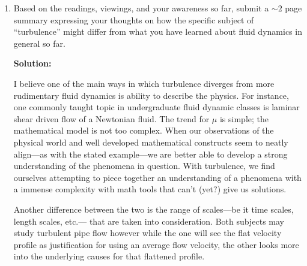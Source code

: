 \documentclass[12tpt]{article}
\newenvironment{Solution}
    {\textbf{Solution:}
    
    \vspace{5mm}
    \begin{tcolorbox}
    }
    {
    \end{tcolorbox}
    \vspace{5mm}
    }
\begin{document}
\begin{enumerate}
\begin{Solution}
For the hot wire anemometer to capture the smallest scale effects the length must be on the same order as $\eta$, where 
\begin{equation}
    \eta \sim  \left[\frac{\nu^3\ell}{\bar{u}^3}\right]^{\frac{1}{4}} \sim \boxed{\SI{1.28E-3}{\meter}}
\end{equation}
To find the permissible noise level, let
\begin{equation}
    E(k) = a k^{-5/3}
\end{equation}
We can integrate this over the given spectrum for this problem, to get $\frac{1}{2}u'u'$
\begin{equation}
    \frac{1}{2}u' u' = \int_\frac{1}{100} ^\frac{1}{1.28E-3} a k^{-5/3} dk = -a\frac{3}{2}\left[780^{-2/3} -  0.01^{-2/3}\right]
\end{equation}
So, with $u'=\SI{0.5}{\meter\per\second}$, we get $a = 0.0038$. The turbulent intensity 
\end{Solution}
\newpage

\item Based on the readings, viewings, and your awareness so far, submit a $\sim2$ page summary expressing your thoughts on how the specific subject of “turbulence” might differ from what you have learned about fluid dynamics in general so far.

\begin{Solution}
\par{I believe one of the main ways in which turbulence diverges from more rudimentary fluid dynamics is ability to describe the physics. For instance, one commonly taught topic in undergraduate fluid dynamic classes is laminar shear driven flow of a Newtonian fluid. The trend for $\mu$ is simple; the mathematical model is not too complex. When our observations of the physical world and well developed mathematical constructs seem to neatly align---as with the stated example---we are better able to develop a strong understanding of the phenomena in question. With turbulence, we find ourselves attempting to piece together an understanding of a phenomena with a immense complexity with math tools that can't (yet?) give us solutions. }
\vspace{2mm}
\par{Another difference between the two is the range of scales---be it time scales, length scales, etc.--- that are taken into consideration. Both subjects may study turbulent pipe flow however while the one will see the flat velocity profile as justification for using an average flow velocity, the other looks more into the underlying causes for that flattened profile. }

\end{Solution}


\end{enumerate}
\end{document}
